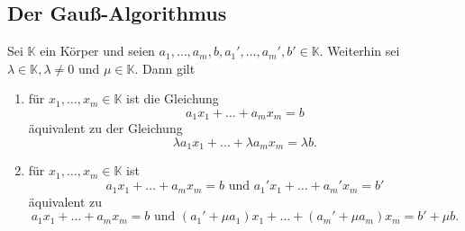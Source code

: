 \documentclass[a4paper,12pt]{article}
\begin{document}
\subsection{Der Gauß-Algorithmus}
Sei $\mathbb{K}$ ein Körper und seien $a_1,\hdots ,a_m,b,a_1',\hdots ,a_m',b' \in \mathbb{K}$. Weiterhin sei $\lambda  \in \mathbb{K},\lambda \neq 0$ und $\mu  \in \mathbb{K}$. Dann gilt
\begin{enumerate}[label=(\alph*)]
        \item für $x_1,\hdots ,x_m \in \mathbb{K}$ ist die Gleichung 
                \[ 
                        a_1x_1+\hdots +a_mx_m=b
                \] 
                äquivalent zu der Gleichung
                \[ 
                        \lambda a_1x_1+\hdots +\lambda a_mx_m=\lambda b
                .\] 
        \item für $x_1,\hdots ,x_m \in \mathbb{K}$ ist 
                \[ 
                        a_1x_1+\hdots +a_mx_m=b\text{ und }a_1'x_1+\hdots +a_m'x_m=b'
                \] 
                äquivalent zu
                \[ 
                        a_1x_1+\hdots +a_mx_m=b\text{ und }\left(a_1'+\mu a_1\right)x_1+\hdots +\left(a_m'+\mu a_m\right)x_m=b'+\mu b
                .\] 
\end{enumerate}
\end{document}
